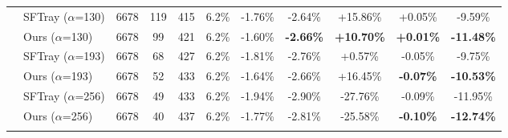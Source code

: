 \begin{table}[t]
{\begin{tabular}{ll|cccc|ccc|cc}
\addlinespace[0.3em]

 & SFTray ($\alpha$=130) & 6678 & 119 & 415 & 6.2\% & -1.76\% & -2.64\% & +15.86\% & +0.05\% & -9.59\% \\

 & Ours ($\alpha$=130) & 6678 & 99 & 421 & 6.2\% & -1.60\% & \textbf{-2.66\%} & \textbf{+10.70\%} & \textbf{+0.01\%} & \textbf{-11.48\%} \\

\addlinespace[0.3em]

 & SFTray ($\alpha$=193) & 6678 & 68 & 427 & 6.2\% & -1.81\% & -2.76\% & +0.57\% & -0.05\% & -9.75\% \\

 & Ours ($\alpha$=193) & 6678 & 52 & 433 & 6.2\% & -1.64\% & -2.66\% & +16.45\% & \textbf{-0.07\%} & \textbf{-10.53\%} \\

\addlinespace[0.3em]

 & SFTray ($\alpha$=256) & 6678 & 49 & 433 & 6.2\% & -1.94\% & -2.90\% & -27.76\% & -0.09\% & -11.95\% \\

 & Ours ($\alpha$=256) & 6678 & 40 & 437 & 6.2\% & -1.77\% & -2.81\% & -25.58\% & \textbf{-0.10\%} & \textbf{-12.74\%} \\

\addlinespace[0.3em]

\midrule

\bottomrule

\end{tabular}

}

\end{table}

